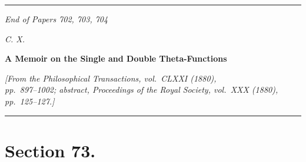 \documentclass[11pt,a4paper]{book}
\begin{document}
\vspace{1em}

\begin{center}
\rule{0.5\textwidth}{0.4pt}
\end{center}

\vspace{1em}

\begin{center}
\textit{End of Papers 702, 703, 704}
\end{center}

\vspace{1em}

\begin{flushright}
\textit{C. X.}
\end{flushright}
\clearpage


\begin{center}
\Large\textbf{A Memoir on the Single and Double Theta-Functions}
\end{center}

\begin{center}
\textit{[From the \textit{Philosophical Transactions}, vol.\ CLXXI (1880),\\
pp.\ 897--1002; abstract, \textit{Proceedings of the Royal Society}, vol.\ XXX (1880),\\
pp.\ 125--127.]}
\end{center}

\vspace{1em}
\noindent\rule{\textwidth}{0.4pt}
\vspace{1em}


\section*{Section 73.}
\label{sec:73}
\end{document}
